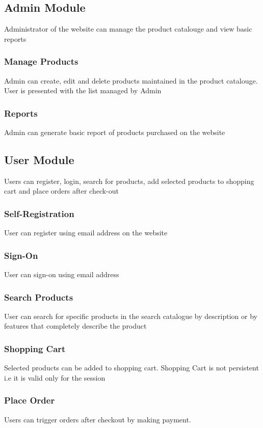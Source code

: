 \documentclass[hidelinks,a4paper,12pt]{article}
\begin{document}
\subsection{Admin Module}
Administrator of the website can manage the product catalouge and view basic reports

\subsubsection{Manage Products}
Admin can create, edit and delete products maintained in the product catalouge. User is presented with the list managed by Admin

\subsubsection{Reports}
Admin can generate basic report of products purchased on the website

\subsection{User Module}
Users can register, login, search for products, add selected products to shopping cart and place orders after check-out

\subsubsection{Self-Registration}
User can register using email address on the website

\subsubsection{Sign-On}
User can sign-on using email address

\subsubsection{Search Products}
User can search for specific products in the search catalogue by description or by features that completely describe the product

\subsubsection{Shopping Cart}
Selected products can be added to shopping cart. Shopping Cart is not persistent i.e it is valid only for the session

\subsubsection{Place Order}
Users can trigger orders after checkout by making payment.
\end{document}
